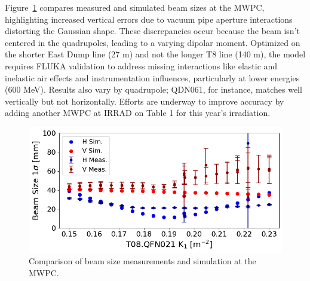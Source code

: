 \documentclass[a4paper,
               biblatex,     %
               ]{jacow}
\begin{document}
Figure~\ref{fig:diff_beam_size} compares measured and simulated beam sizes at the MWPC, highlighting increased vertical errors due to vacuum pipe aperture interactions distorting the Gaussian shape. These discrepancies occur because the beam isn't centered in the quadrupoles, leading to a varying dipolar moment. Optimized on the shorter East Dump line (27 m) and not the longer T8 line (140 m), the model requires FLUKA validation to address missing interactions like elastic and inelastic air effects and instrumentation influences, particularly at lower energies (600 MeV). Results also vary by quadrupole; QDN061, for instance, matches well vertically but not horizontally. Efforts are underway to improve accuracy by adding another MWPC at IRRAD on Table 1 for this year's irradiation.

\begin{figure}[!htb]
   \centering
   \includegraphics*[width=0.8\columnwidth]{THPR30_f4.png}
   \caption{Comparison of beam size measurements and simulation at the MWPC.}
   \label{fig:diff_beam_size}
\end{figure}








\end{document}
